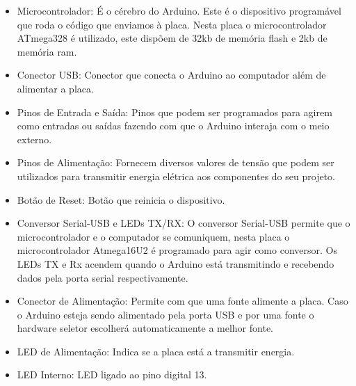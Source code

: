 \begin{itemize}
	\item Microcontrolador: É o cérebro do Arduino. Este é o dispositivo programável que roda o código que enviamos à placa. Nesta placa o microcontrolador ATmega328 é utilizado, este dispõem de 32kb de memória flash e 2kb de memória ram.
	
	\item  Conector USB: Conector que conecta o Arduino ao computador além de alimentar a placa.
	
	\item  Pinos de Entrada e Saída: Pinos que podem ser programados para agirem como entradas ou saídas fazendo com que o Arduino interaja com o meio externo.
	
	\item Pinos de Alimentação: Fornecem diversos valores de tensão que podem ser utilizados para transmitir energia elétrica aos componentes do seu projeto.
	\item  Botão de Reset: Botão que reinicia o dispositivo.
	\item  Conversor Serial-USB e LEDs TX/RX: O conversor Serial-USB permite que o microcontrolador e o computador se comuniquem, nesta placa o microcontrolador Atmega16U2 é programado para agir como conversor. Os LEDs TX e Rx acendem quando o Arduino está transmitindo e recebendo dados pela porta serial respectivamente.
	\item  Conector de Alimentação: Permite com que uma fonte alimente a placa. Caso o Arduino esteja sendo alimentado pela porta USB e por uma fonte o hardware seletor escolherá automaticamente a melhor fonte.
	\item LED de Alimentação: Indica se a placa está a transmitir energia.
	\item LED Interno: LED ligado ao pino digital 13.
	
	
	
\end{itemize}




